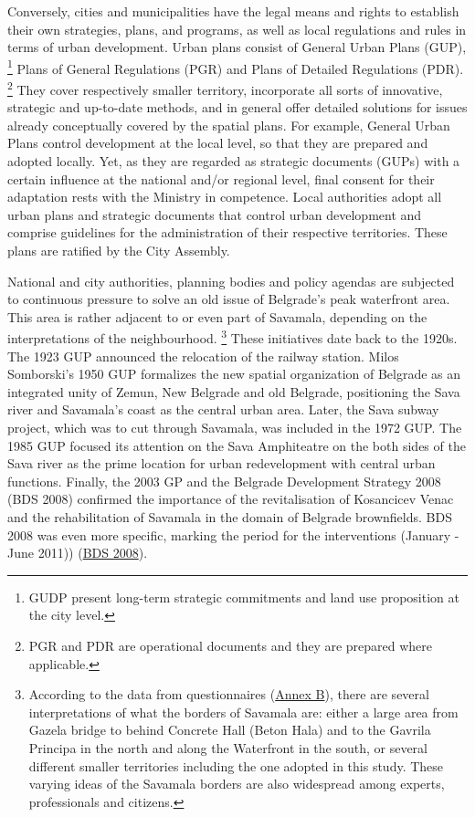 \documentclass[11pt]{report}
\begin{document}
\begin{itemize}
Conversely, cities and municipalities have the legal means and rights to establish their own strategies, plans, and programs, as well as local regulations and rules in terms of urban development. Urban plans consist of General Urban Plans (GUP),
\footnote{GUDP present long-term strategic commitments and land use proposition at the city level.} Plans of General Regulations (PGR) and Plans of Detailed Regulations (PDR).
\footnote{PGR and PDR are operational documents and they are prepared where applicable.}
They cover respectively smaller territory, incorporate all sorts of innovative, strategic and up-to-date methods, and in general offer detailed solutions for issues already conceptually covered by the spatial plans. For example, General Urban Plans control development at the local level, so that they are prepared and adopted locally. Yet, as they are regarded as strategic documents (GUPs) with a certain influence at the national and/or regional level, final consent for their adaptation rests with the Ministry in competence. Local authorities adopt all urban plans and strategic documents that control urban development and comprise guidelines for the administration of their respective territories. These plans are ratified by the City Assembly.

National and city authorities, planning bodies and policy agendas are subjected to continuous pressure to solve an old issue of Belgrade’s peak waterfront area. This area is rather adjacent to or even part of Savamala, depending on the interpretations of the neighbourhood.
\footnote{According to the data from questionnaires (\href{ref}{Annex B}), there are several interpretations of what the borders of Savamala are: either a large area from Gazela bridge to behind Concrete Hall (Beton Hala) and to the Gavrila Principa in the north and along the Waterfront in the south, or several different smaller territories including the one adopted in this study. These varying ideas of the Savamala borders are also widespread among experts, professionals and citizens.}
These initiatives date back to the 1920s. The 1923 GUP announced the relocation of the railway station. Milos Somborski’s 1950 GUP formalizes the new spatial organization of Belgrade as an integrated unity of Zemun, New Belgrade and old Belgrade, positioning the Sava river and Savamala’s coast as the central urban area. Later, the Sava subway project, which was to cut through Savamala, was included in the 1972 GUP. The 1985 GUP focused its attention on the Sava Amphiteatre on the both sides of the Sava river as the prime location for urban redevelopment with central urban functions. Finally, the 2003 GP and the Belgrade Development Strategy 2008 (BDS 2008) confirmed the importance of the revitalisation of Kosancicev Venac and the rehabilitation of Savamala in the domain of Belgrade brownfields. BDS 2008 was even more specific, marking the period for the interventions (January - June 2011)) (\href{ref}{BDS 2008}).
\\


\end{itemize}
\end{document}
